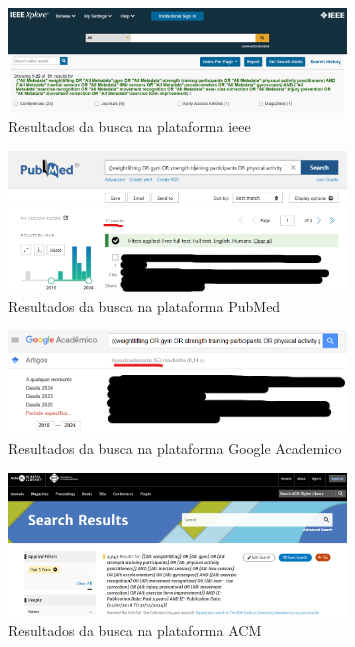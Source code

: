 \documentclass[a4paper,12pt]{article}
\begin{document}
\begin{figure}[ht]
    \centering
    \includegraphics[width=0.8\textwidth]{./Images/Strings/ieee.png}
    \caption{Resultados da busca na plataforma ieee}
    \label{fig:busca_ieee}
\end{figure}

\begin{figure}[ht]
    \centering
    \includegraphics[width=0.8\textwidth]{./Images/Strings/pubmed.png}
    \caption{Resultados da busca na plataforma PubMed}
    \label{fig:busca_pubmed}
\end{figure}

\begin{figure}[ht]
    \centering
    \includegraphics[width=0.8\textwidth]{./Images/Strings/googleAcademic.png}
    \caption{Resultados da busca na plataforma Google Academico}
    \label{fig:busca_google}
\end{figure}

\begin{figure}[ht]
    \centering
    \includegraphics[width=0.8\textwidth]{./Images/Strings/ACM.png}
    \caption{Resultados da busca na plataforma ACM}
    \label{fig:busca_acm}
\end{figure}
\newpage
\end{document}
